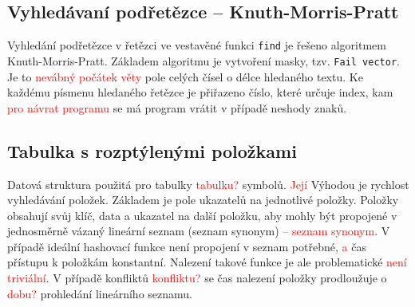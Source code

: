 \documentclass[a4paper, 12pt]{article}
\begin{document}
\subsection{Vyhledávaní podřetězce -- Knuth-Morris-Pratt}
Vyhledání podřetězce v řetězci ve vestavěné funkci \texttt{find} je řešeno
algoritmem Knuth-Morris-Pratt. Základem algoritmu je vytvoření masky, tzv.
\texttt{Fail vector}. Je to \textcolor{red}{nevábný počátek věty} pole celých čísel o délce hledaného textu. Ke
každému písmenu hledaného řetězce je přiřazeno číslo, které určuje index, kam \textcolor{red}{pro návrat programu}
se má program vrátit v případě neshody znaků.

\subsection{Tabulka s rozptýlenými položkami}
Datová struktura použitá pro tabulky \textcolor{red}{tabulku?} symbolů. \textcolor{red}{Její} Výhodou je rychlost vyhledávání
položek. Základem je pole ukazatelů na
jednotlivé položky. Položky obsahují svůj klíč, data a ukazatel na další
položku, aby mohly být propojené v jednosměrně vázaný lineární
seznam (seznam synonym) \textcolor{red}{-- seznam synonym}. V případě ideální hashovací funkce není propojení v
seznam potřebné, \textcolor{red}{a} čas přístupu k položkám konstantní. Nalezení takové
funkce je ale problematické \textcolor{red}{není triviální}. V případě konfliktů \textcolor{red}{konfliktu?} se čas nalezení položky
prodloužuje o \textcolor{red}{dobu?} prohledání lineárního seznamu.

\newpage
\appendix
\end{document}
